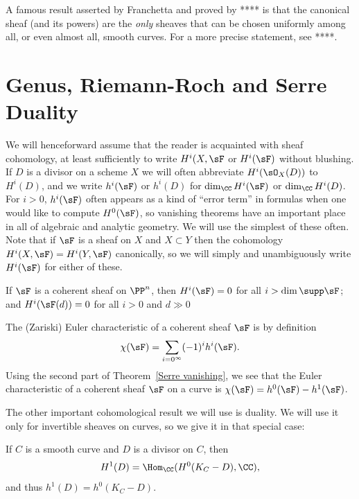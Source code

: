\begin{fact}
A famous result asserted by Franchetta and proved by **** is that the canonical sheaf (and its powers) are the \emph{only} sheaves that can be chosen uniformly among all, or even almost all, smooth curves. For a more precise statement, see ****.
\end{fact}

\section{Genus, Riemann-Roch and Serre Duality}

We will henceforward assume that the reader is acquainted with sheaf cohomology, at least sufficiently to write
$H^i(X, \sF$ or  $H^i(\sF)$ without blushing. If $D$ is a divisor on a scheme $X$ we will often
abbreviate $H^i(\sO_X(D))$ to $H^i(D)$, and we write $h^i(\sF)$ or $h^{i}(D)$ for $\dim_{\CC}H^i(\sF)$ or $\dim_{\CC}H^i(D)$. For $i>0$, $h^{i}(\sF)$ often appears as a kind of ``error term'' in formulas when one would like to compute
$H^{0}(\sF)$, so vanishing theorems have an important place in all of algebraic and analytic geometry. We will use the simplest of these often.
Note that if $\sF$ is a sheaf on $X$ and $X\subset Y$ then the cohomology  $H^i(X, \sF) = H^i(Y,\sF)$ canonically, so we will
simply and unambiguously write $H^i(\sF)$ for either of these.

\begin{theorem}\label{Serre vanishing} If $\sF$ is a coherent sheaf on $\PP^n$, then
$H^{i}(\sF)= 0$ for all $i>\dim \supp \sF$; and  $H^{i}(\sF(d))= 0$ for all $i>0$ and $d\gg 0$  
\end{theorem}

The (Zariski) Euler characteristic of a coherent sheaf $\sF$ is by definition 
$$
\chi(\sF) = \sum_{i=0^\infty} (-1)^ih^i(\sF).
$$
Using the second part of Theorem~\ref{Serre vanishing}, we see that the Euler characteristic of a coherent sheaf $\sF$ on a curve
 is  $\chi(\sF) = h^0(\sF) - h^1(\sF)$.
 
 The other important cohomological result we will use is duality. We will use it only for invertible sheaves on curves, so we give it in
 that special case:
 
\begin{theorem}\label{sd}
If $C$ is a smooth curve and $D$ is a divisor on $C$, then
$$
H^1(D) =\Hom_\CC(H^0(K_C-D), \CC),
$$
and thus $h^1(D) = h^0(K_C-D)$.
\end{theorem}

